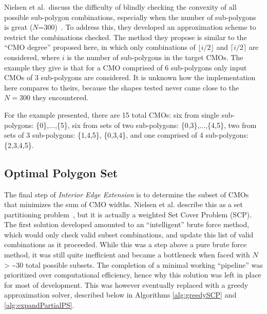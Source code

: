 Nielsen et al.\ discuss the difficulty of blindly checking the convexity of all possible sub-polygon combinations, especially when the number of sub-polygons is great ($N$=300)~\cite{IntEdgeExt}.
To address this, they developed an approximation scheme to restrict the combinations checked.
The method they propose is similar to the ``CMO degree'' proposed here, in which only combinations of $\lfloor i/2 \rfloor$ and $\lceil i/2 \rceil$ are considered, where $i$ is the number of sub-polygons in the target CMOs.
The example they give is that for a CMO comprised of 6 sub-polygons only input CMOs of 3 sub-polygons are considered.
It is unknown how the implementation here compares to theirs, because the shapes tested never came close to the $N=300$ they encountered.

For the example presented, there are 15 total CMOs: six from single sub-polygons: \{0\},...,\{5\}, six from sets of two sub-polygons: \{0,3\},...,\{4,5\}, two from sets of 3 sub-polygons: \{1,4,5\}, \{0,3,4\}, and one comprised of 4 sub-polygons: \{2,3,4,5\}.

\subsection{Optimal Polygon Set}%
The final step of \textit{Interior Edge Extension} is to determine the subset of CMOs that minimizes the sum of CMO widths.
Nielsen et al. describe this as a set partitioning problem~\cite{IntEdgeExt}, but it is actually a weighted Set Cover Problem (SCP).
The first solution developed amounted to an ``intelligent'' brute force method, which would only check valid subset combinations, and update this list of valid combinations as it proceeded.
While this was a step above a pure brute force method, it was still quite inefficient and became a bottleneck when faced with $N$ > \textasciitilde 30 total possible subsets.
The completion of a minimal working ``pipeline'' was prioritized over computational efficiency, hence why this solution was left in place for most of development.
This was however eventually replaced with a greedy approximation solver, described below in Algorithms \ref{alg:greedySCP} and \ref{alg:expandPartialPS}.


